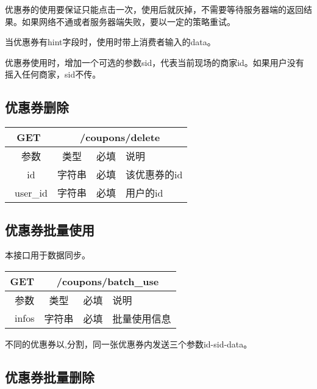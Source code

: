 优惠券的使用要保证只能点击一次，使用后就灰掉，不需要等待服务器端的返回结果。如果网络不通或者服务器端失败，要以一定的策略重试。

当优惠券有hint字段时，使用时带上消费者输入的data。

优惠券使用时，增加一个可选的参数sid，代表当前现场的商家id。如果用户没有摇入任何商家，sid不传。

\subsection{优惠券删除}


\begin{table}[H]
   \begin{center}
\begin{tabular}{|c|c|c|p{12cm}|}
\hline
GET & \multicolumn{3}{|c|}{/coupons/delete} \\
\hline\hline
 \  参数  & 类型 & 必填 &  说明  \\
\hline
 \  id  & 字符串 & 必填 &  该优惠券的id  \\
\hline
 \  user\_id  & 字符串 & 必填 &  用户的id  \\ 
\hline
\end{tabular}
   \end{center}
\end{table}


\subsection{优惠券批量使用}
本接口用于数据同步。

\begin{table}[H]
   \begin{center}
\begin{tabular}{|c|c|c|p{12cm}|}
\hline
GET & \multicolumn{3}{|c|}{/coupons/batch\_use} \\
\hline\hline
 \  参数  & 类型 & 必填 &  说明  \\
\hline
 \  infos  & 字符串 & 必填 &  批量使用信息 \\
\hline
\end{tabular}
   \end{center}
\end{table}
不同的优惠券以,分割，同一张优惠券内发送三个参数id-sid-data。



\subsection{优惠券批量删除}

